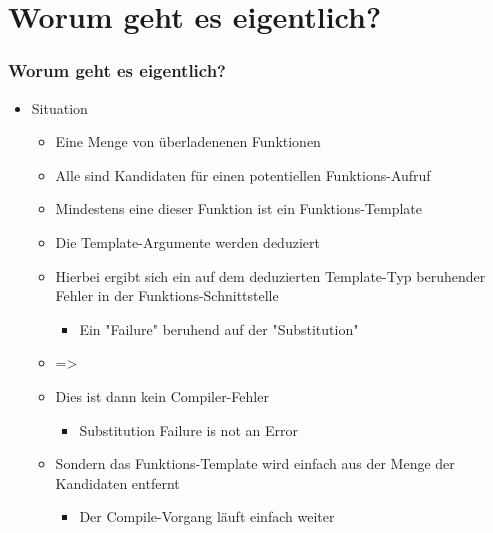 \documentclass[hyperref={pdfpagelabels=false}]{beamer}
\begin{document}
\section{Worum geht es eigentlich?} 
\begin{frame}
\frametitle{Worum geht es eigentlich?}
\begin{itemize}
\item Situation

\begin{itemize}
\item Eine Menge von überladenenen Funktionen
\item Alle sind Kandidaten für einen potentiellen Funktions-Aufruf
\item Mindestens eine dieser Funktion ist ein Funktions-Template
\item Die Template-Argumente werden deduziert
\item Hierbei ergibt sich ein auf dem deduzierten Template-Typ beruhender Fehler in der Funktions-Schnittstelle
\begin{itemize}
\item Ein "Failure" beruhend auf der "Substitution"
\end{itemize}
\end{itemize}

\begin{itemize}
\item =>
\item Dies ist dann kein Compiler-Fehler
\begin{itemize}
\item Substitution Failure is not an Error
\end{itemize}

\item Sondern das Funktions-Template wird einfach aus der Menge der Kandidaten entfernt
\begin{itemize}
\item Der Compile-Vorgang läuft einfach weiter
\end{itemize}

\end{itemize} 
\end{itemize} 
\end{frame}
\end{document}
